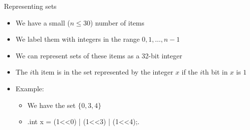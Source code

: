 \documentclass[12pt,t]{beamer}
\newcommand{\bi}{\begin{itemize}}
\newcommand{\ei}{\end{itemize}}
\begin{document}
%
%
%
%



\begin{frame}[fragile]{Representing sets}
    \vspace{30pt}
    \bi
        \item We have a small ($n\leq 30$) number of items
        \item We label them with integers in the range $0,1,\ldots,n-1$
        \item We can represent sets of these items as a 32-bit integer
        \item The $i$th item is in the set represented by the integer $x$ if the $i$th bit in $x$ is $1$
        \item Example:
            \bi
                \item We have the set $\{0,3,4\}$
                \item {}.int x = (1<<0) | (1<<3) | (1<<4);.
            \ei
    \ei
\end{frame}
\end{document}
